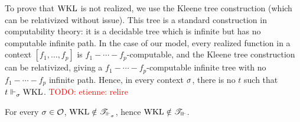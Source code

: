 \documentclass[a4paper,UKenglish,cleveref, autoref, thm-restate]{lipics-v2021}
\newcommand{\todo}[1]{\textcolor{red}{TODO: #1}}
\begin{document}
To prove that $\mathrm{WKL}$ is not realized, we use the Kleene tree \cite{Kleene1953-KLERFA-3} construction (which can be relativized without issue). This tree is a standard construction in computability theory: it is a decidable tree which is infinite but has no computable infinite path. In the case of our model, every realized function in a context $[f_1,\ldots,f_p]$ is $f_1-\cdots-f_p$-computable, and the Kleene tree construction can be relativized, giving a $f_1-\cdots-f_p$-computable infinite tree with no $f_1-\cdots-f_p$ infinite path. Hence, in every context $\sigma$, there is no $t$ such that $t\Vdash_{\sigma}^{} \mathrm{WKL}$.
\todo{etienne: relire}


\begin{theorem}
  For every $\sigma \in \mathcal O$, $\mathrm{WKL}\notin \mathscr T_{\Vdash_{\sigma}^{}}$, hence $\mathrm{WKL}\notin \mathscr T_{\Vvdash}$.
\end{theorem}
\vlong{
\begin{proof}
\todo{utile ?}

\end{proof}
}
\end{document}
